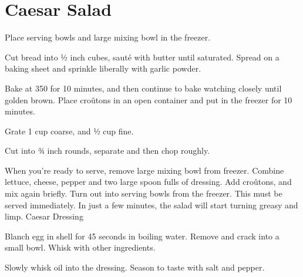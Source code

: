 
\section{Caesar Salad}
\begin{multicols*}{3}

Place serving bowls and large mixing bowl in the freezer.


Cut bread into ½ inch cubes, sauté  with butter until saturated. Spread on a baking sheet and sprinkle liberally with garlic powder.

Bake at 350 for 10 minutes, and then continue to bake watching closely until golden brown.
Place croûtons in an open container and put in the freezer for 10 minutes.


Grate 1 cup coarse, and ½ cup fine.


Cut into ¾ inch rounds, separate and then chop roughly.


When you're ready to serve, remove large mixing bowl from freezer. Combine lettuce, cheese, pepper and two large spoon fulls of dressing.
Add croûtons, and mix again briefly. Turn out into serving bowls from the freezer.
This must be served immediately. In just a few minutes, the salad will start turning greasy and limp.
Caesar Dressing


Blanch egg in shell for 45 seconds in boiling water. Remove and crack into a small bowl. Whisk with other ingredients.


Slowly whisk oil into the dressing. Season to taste with salt and pepper.

\end{multicols*}
\clearpage

